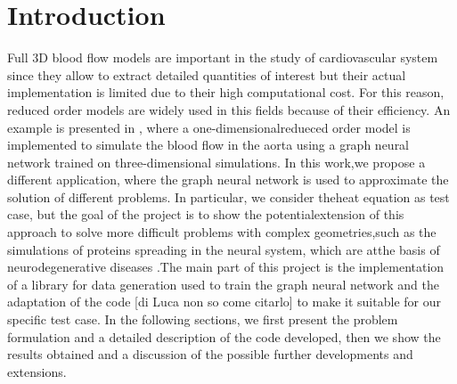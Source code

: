 \documentclass[11pt,a4paper]{article}
\begin{document}




\section{Introduction}
Full 3D blood flow models are important in the study of cardiovascular system since they allow to extract detailed quantities of interest but their actual implementation is limited due to their high computational cost. For this reason, reduced order models are widely used in this fields because of their efficiency. An example is presented in \cite{Luca}, where a one-dimensionalredueced order model is implemented to simulate the blood flow in the aorta using a graph neural network trained on three-dimensional simulations. In this work,we propose a different application, where the graph neural network is used to approximate the solution of different problems. In particular, we consider theheat equation as test case, but the goal of the project is to show the potentialextension of this approach to solve more difficult problems with complex geometries,such as the simulations of proteins spreading in the neural system, which are atthe basis of neurodegenerative diseases \cite{MattiaCorti}.The main part of this project is the implementation of a library for data generation used to train the graph neural network and the adaptation of the code [di Luca non so come citarlo] to make it suitable for our specific test case. In the following sections, we first present the problem formulation and a detailed description of the code developed, then we show the results obtained and a discussion of the possible further developments and extensions.

\end{document}
